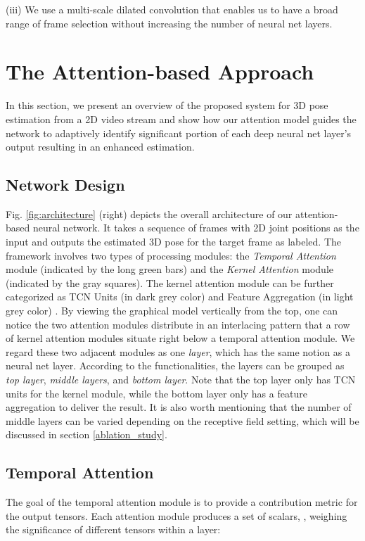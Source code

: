 \documentclass[twocolumn]{svjour3}          \smartqed  \usepackage{graphicx}
\begin{document}
(iii) We use a multi-scale dilated convolution that enables us to have a broad range of frame selection without increasing the number of neural net layers.


\section{The Attention-based Approach} \label{sec:attention}
In this section, we present an overview of the proposed system for 3D pose estimation from a 2D video stream and show how our attention model guides the network to adaptively identify significant portion of each deep neural net layer's output resulting in an enhanced estimation. 


\subsection{Network Design} 
Fig. \ref{fig:architecture} (right) depicts the overall architecture of our attention-based neural network. It takes a sequence of  frames with 2D joint positions as the input and outputs the estimated 3D pose for the target frame as labeled. The framework involves two types of processing modules: the \emph{Temporal Attention} module (indicated by the long green bars) and the \emph{Kernel Attention} module (indicated by the gray squares). The kernel attention module can be further categorized as TCN Units (in dark grey color) and Feature Aggregation (in light grey color) \citep{he2016deep}. By viewing the graphical model vertically from the top, one can notice the two attention modules distribute in an interlacing pattern that a row of kernel attention modules situate right below a temporal attention module. We regard these two adjacent modules as one \emph{layer}, which has the same notion as a neural net layer. According to the functionalities, the layers can be grouped as \emph{top layer}, \emph{middle layers}, and \emph{bottom layer}. Note that the top layer only has TCN units for the kernel module, while the bottom layer only has a feature aggregation to deliver the result. It is also worth mentioning that the number of middle layers can be varied depending on the receptive field setting, which will be discussed in section \ref{ablation_study}.

\subsection{Temporal Attention}\label{units}
The goal of the temporal attention module is to provide a contribution metric for the output tensors. Each attention module produces a set of scalars, , weighing the significance of different tensors  within a layer:
\end{document}
